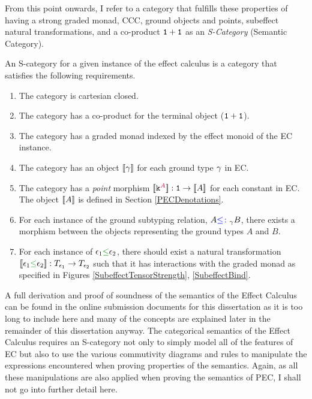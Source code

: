 From this point onwards, I refer to a category that fulfills these properties of having a strong graded monad, CCC, ground objects and points, subeffect natural transformations, and a co-product $\texttt{1} + \texttt{1}$ as an \textit{S-Category} (Semantic Category).

\begin{framed}
    \begin{definition}\label{SCategoryDefinition}   
        An S-category for a given instance of the effect calculus is a category that satisfies the following requirements.
        \begin{enumerate}[label=\roman*.]
            \item The category is cartesian closed.
            \item The category has a co-product for the terminal object ($\texttt{1} + \texttt{1}$).
            \item The category has a graded monad indexed by the effect monoid of the EC instance.
            \item The category has an object ${\bf [\![}\gamma{\bf ]\!]}$ for each ground type $\gamma$ in EC.
            \item The category has a \textit{point} morphism ${\bf [\![}\texttt{k}^{\color{purple} A}{\bf ]\!]}: \texttt{1}\rightarrow {\bf [\![}A{\bf ]\!]}$ for each constant in EC. The object ${\bf [\![}A{\bf ]\!]}$ is defined in Section \ref{PECDenotations}.
            \item For each instance of the ground subtyping relation, $A {\color{blue} \leq\colon}_\gamma B$, there exists a morphism between the objects representing the ground types $A$ and $B$.
            \item For each instance of $\e_1 \subeffect \e_2$, there should exist a natural transformation $\db{\e_1\subeffect\e_2}: \T{\e_1}{}\rightarrow\T{\e_2}{}$ such that it has interactions with the graded monad as specified in Figures \ref{SubeffectTensorStrength}, \ref{SubeffectBind}.
        \end{enumerate}
    \end{definition}
\end{framed}

A full derivation and proof of soundness of the semantics of the Effect Calculus can be found in the online submission documents for this dissertation as it is too long to include here and many of the concepts are explained later in the remainder of this dissertation anyway. The categorical semantics of the Effect Calculus requires an S-category not only to simply model all of the features of EC but also to use the various commutivity diagrams and rules to manipulate the expressions encountered when proving properties of the semantics. Again, as all these manipulations are also applied when proving the semantics of PEC, I shall not go into further detail here.



